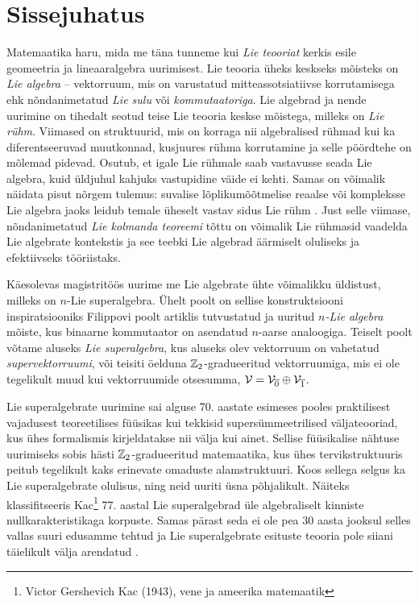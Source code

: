 
\section*{Sissejuhatus}

Matemaatika haru, mida me täna tunneme kui \emph{Lie teooriat} kerkis esile
geomeetria ja lineaaralgebra uurimisest. Lie teooria üheks keskseks mõisteks
on \emph{Lie algebra} -- vektorruum, mis on varustatud
mitteassotsiatiivse korrutamisega ehk nõndanimetatud \emph{Lie sulu} või
\emph{kommutaatoriga}.
Lie algebrad ja nende uurimine on tihedalt seotud teise Lie teooria keskse
mõistega, milleks on \emph{Lie rühm}. Viimased on
struktuurid, mis on korraga nii algebralised rühmad kui ka diferentseeruvad
muutkonnad, kusjuures rühma korrutamine ja selle pöördtehe on mõlemad
pidevad. Osutub, et igale Lie rühmale saab vastavusse seada Lie algebra, kuid
üldjuhul kahjuks vastupidine väide ei kehti. Samas on võimalik näidata
pisut nõrgem tulemus: suvalise lõplikumõõtmelise
reaalse või kompleksse Lie algebra jaoks leidub temale üheselt
vastav sidus Lie rühm \cite{kirillov2008introduction}. Just selle viimase,
nõndanimetatud \emph{Lie kolmanda teoreemi} tõttu on võimalik
Lie rühmasid vaadelda Lie algebrate kontekstis ja see teebki Lie algebrad
äärmiselt oluliseks ja efektiivseks tööriistaks.

Käesolevas magistritöös uurime me Lie algebrate ühte võimalikku üldistust,
milleks on $n$-Lie superalgebra. Ühelt poolt on sellise konstruktsiooni
inspiratsiooniks Filippovi poolt artiklis \cite{filippov1985} tutvustatud ja
uuritud \emph{$n$-Lie algebra} mõiste, kus binaarne kommutaator on asendatud
$n$-aarse analoogiga. Teiselt poolt võtame aluseks \emph{Lie superalgebra},
kus aluseks olev vektorruum on vahetatud \emph{supervektorruumi}, või
teisiti öelduna $\mathbb{Z}_2$-gradueeritud vektorruumiga, mis ei ole tegelikult
muud kui vektorruumide otsesumma,
$\mathcal{V} = \mathcal{V}_{\overline{0}} \oplus \mathcal{V}_{\overline{1}}$.

Lie superalgebrate uurimine sai alguse 70. aastate esimeses pooles praktilisest
vajadusest teoreetilises füüsikas kui tekkisid supersümmeetrilised
väljateooriad, kus ühes formalismis kirjeldatakse nii välja kui ainet.
Sellise füüsikalise nähtuse uurimiseks sobis hästi $\mathbb{Z}_2$-gradueeritud
matemaatika, kus ühes tervikstruktuuris peitub tegelikult kaks erinevate
omaduste alamstruktuuri. Koos sellega selgus ka Lie superalgebrate olulisus,
ning neid uuriti üsna põhjalikult. Näiteks klassifitseeris
Kac\footnote{Victor Gershevich Kac (1943), vene ja ameerika matemaatik}
77. aastal Lie superalgebrad üle algebraliselt kinniste nullkarakteristikaga
korpuste. Samas pärast seda ei ole pea 30 aasta jooksul selles vallas suuri
edusamme tehtud ja Lie superalgebrate esituste teooria pole siiani
täielikult välja arendatud \cite{musson2012lie}.

